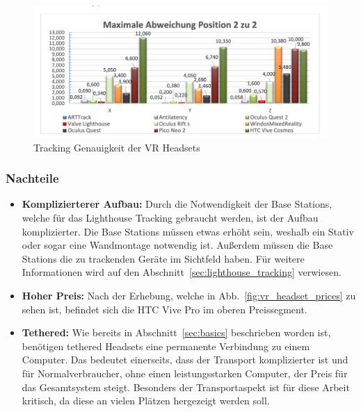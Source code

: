 \begin{figure}
    \centering
    \includegraphics[scale=0.4]{pics/tracking_precision_statistic}
    \caption{Tracking Genauigkeit der VR Headsets~\cite{Macedo_2020}}
    \label{fig:tracking_precision_statistic}
\end{figure}

\subsubsection{Nachteile}

\begin{itemize}
    \item \textbf{Komplizierterer Aufbau:} Durch die Notwendigkeit der Base Stations, welche für das Lighthouse Tracking gebraucht werden, ist der Aufbau komplizierter.
    Die Base Stations müssen etwas erhöht sein, weshalb ein Stativ oder sogar eine Wandmontage notwendig ist.
    Außerdem müssen die Base Stations die zu trackenden Geräte im Sichtfeld haben.
    Für weitere Informationen wird auf den Abschnitt~\ref{sec:lighthouse_tracking} verwiesen.
    \item \textbf{Hoher Preis:} Nach der Erhebung, welche in Abb.~\ref{fig:vr_headset_prices} zu sehen ist, befindet sich die HTC Vive Pro im oberen Preissegment.
    \item \textbf{Tethered:} Wie bereits in Abschnitt~\ref{sec:basics} beschrieben worden ist, benötigen tethered Headsets eine permanente Verbindung zu einem Computer.
    Das bedeutet einerseits, dass der Transport komplizierter ist und für Normalverbraucher, ohne einen leistungsstarken Computer, der Preis für das Gesamtsystem steigt.
    Besonders der Transportaspekt ist für diese Arbeit kritisch, da diese an vielen Plätzen hergezeigt werden soll.
\end{itemize}

